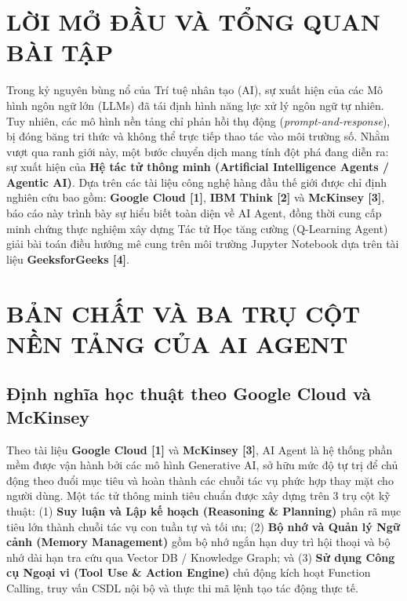 \documentclass[12pt,a4paper]{article}
\begin{document}
\clearpage
{}


\section*{LỜI MỞ ĐẦU VÀ TỔNG QUAN BÀI TẬP}

Trong kỷ nguyên bùng nổ của Trí tuệ nhân tạo (AI), sự xuất hiện của các Mô hình ngôn ngữ lớn (LLMs) đã tái định hình năng lực xử lý ngôn ngữ tự nhiên. Tuy nhiên, các mô hình nền tảng chỉ phản hồi thụ động (\textit{prompt-and-response}), bị đóng băng tri thức và không thể trực tiếp thao tác vào môi trường số. Nhằm vượt qua ranh giới này, một bước chuyển dịch mang tính đột phá đang diễn ra: sự xuất hiện của \textbf{Hệ tác tử thông minh (Artificial Intelligence Agents / Agentic AI)}. Dựa trên các tài liệu công nghệ hàng đầu thế giới được chỉ định nghiên cứu bao gồm: \textbf{Google Cloud [1]}, \textbf{IBM Think [2]} và \textbf{McKinsey [3]}, báo cáo này trình bày sự hiểu biết toàn diện về AI Agent, đồng thời cung cấp minh chứng thực nghiệm xây dựng Tác tử Học tăng cường (Q-Learning Agent) giải bài toán điều hướng mê cung trên môi trường Jupyter Notebook dựa trên tài liệu \textbf{GeeksforGeeks [4]}.

\section{BẢN CHẤT VÀ BA TRỤ CỘT NỀN TẢNG CỦA AI AGENT}

\subsection{Định nghĩa học thuật theo Google Cloud và McKinsey}
Theo tài liệu \textbf{Google Cloud [1]} và \textbf{McKinsey [3]}, AI Agent là hệ thống phần mềm được vận hành bởi các mô hình Generative AI, sở hữu mức độ tự trị để chủ động theo đuổi mục tiêu và hoàn thành các chuỗi tác vụ phức hợp thay mặt cho người dùng. Một tác tử thông minh tiêu chuẩn được xây dựng trên 3 trụ cột kỹ thuật: (1) \textbf{Suy luận và Lập kế hoạch (Reasoning \& Planning)} phân rã mục tiêu lớn thành chuỗi tác vụ con tuần tự và tối ưu; (2) \textbf{Bộ nhớ và Quản lý Ngữ cảnh (Memory Management)} gồm bộ nhớ ngắn hạn duy trì hội thoại và bộ nhớ dài hạn tra cứu qua Vector DB / Knowledge Graph; và (3) \textbf{Sử dụng Công cụ Ngoại vi (Tool Use \& Action Engine)} chủ động kích hoạt Function Calling, truy vấn CSDL nội bộ và thực thi mã lệnh tạo tác động thực tế.
\end{document}
